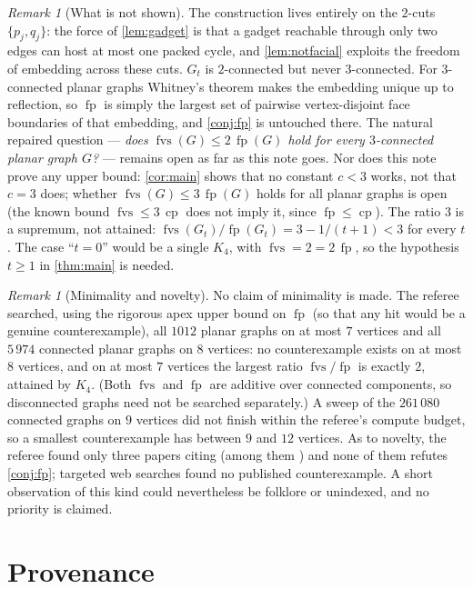\documentclass[11pt,a4paper]{article}
\theoremstyle{plain}
\theoremstyle{definition}
\theoremstyle{remark}
\newtheorem{remark}[theorem]{Remark}
\newcommand{\fvs}{\operatorname{fvs}}
\newcommand{\cp}{\operatorname{cp}}
\newcommand{\fp}{\operatorname{fp}}
\newcommand{\Gtt}{G_t}
\begin{document}
\begin{remark}[What is not shown]\label{rem:limits}
The construction lives entirely on the $2$-cuts $\{p_j,q_j\}$: the force of \cref{lem:gadget} is that a gadget reachable through only two edges can host at most one packed cycle, and \cref{lem:notfacial} exploits the freedom of embedding across these cuts. $\Gtt$ is $2$-connected but never $3$-connected. For $3$-connected planar graphs Whitney's theorem \cite{Whitney32} makes the embedding unique up to reflection, so $\fp$ is simply the largest set of pairwise vertex-disjoint face boundaries of that embedding, and \cref{conj:fp} is untouched there. The natural repaired question --- \emph{does $\fvs(G)\le2\,\fp(G)$ hold for every $3$-connected planar graph $G$?} --- remains open as far as this note goes. Nor does this note prove any upper bound: \cref{cor:main} shows that no constant $c<3$ works, not that $c=3$ does; whether $\fvs(G)\le3\,\fp(G)$ holds for all planar graphs is open (the known bound $\fvs\le3\,\cp$ does not imply it, since $\fp\le\cp$). The ratio $3$ is a supremum, not attained: $\fvs(\Gtt)/\fp(\Gtt)=3-1/(t+1)<3$ for every $t$. The case ``$t=0$'' would be a single $K_4$, with $\fvs=2=2\,\fp$, so the hypothesis $t\ge1$ in \cref{thm:main} is needed.
\end{remark}

\begin{remark}[Minimality and novelty]\label{rem:novelty}
No claim of minimality is made. The referee searched, using the rigorous apex upper bound on $\fp$ (so that any hit would be a genuine counterexample), all $1012$ planar graphs on at most $7$ vertices and all $5\,974$ connected planar graphs on $8$ vertices: no counterexample exists on at most $8$ vertices, and on at most $7$ vertices the largest ratio $\fvs/\fp$ is exactly $2$, attained by $K_4$. (Both $\fvs$ and $\fp$ are additive over connected components, so disconnected graphs need not be searched separately.) A sweep of the $261\,080$ connected graphs on $9$ vertices did not finish within the referee's compute budget, so a smallest counterexample has between $9$ and $12$ vertices. As to novelty, the referee found only three papers citing \cite{BDMNPP19} (among them \cite{BG24}) and none of them refutes \cref{conj:fp}; targeted web searches found no published counterexample. A short observation of this kind could nevertheless be folklore or unindexed, and no priority is claimed.
\end{remark}

\section{Provenance}\label{sec:provenance}
\end{document}
